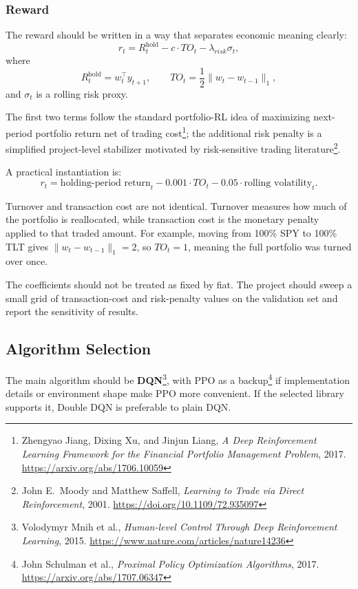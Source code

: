 \documentclass[11pt,a4paper]{article}
\newcommand{\fncite}[2]{\footnote{#1. \url{#2}}}
\begin{document}
\subsubsection{Reward}

The reward should be written in a way that separates economic meaning clearly:
\[
r_t = R^{\text{hold}}_t - c \cdot TO_t - \lambda_{risk}\sigma_t,
\]
where
\[
R^{\text{hold}}_t = w_t^\top y_{t+1},
\qquad
TO_t = \frac{1}{2}\lVert w_t - w_{t-1} \rVert_1,
\]
and $\sigma_t$ is a rolling risk proxy.

The first two terms follow the standard portfolio-RL idea of maximizing next-period portfolio return net of trading cost\fncite{Zhengyao Jiang, Dixing Xu, and Jinjun Liang, \emph{A Deep Reinforcement Learning Framework for the Financial Portfolio Management Problem}, 2017}{https://arxiv.org/abs/1706.10059}; the additional risk penalty is a simplified project-level stabilizer motivated by risk-sensitive trading literature\fncite{John E.~Moody and Matthew Saffell, \emph{Learning to Trade via Direct Reinforcement}, 2001}{https://doi.org/10.1109/72.935097}.

A practical instantiation is:
\[
r_t = \text{holding-period return}_t - 0.001 \cdot TO_t - 0.05 \cdot \text{rolling volatility}_t.
\]

Turnover and transaction cost are not identical.
Turnover measures how much of the portfolio is reallocated, while transaction cost is the monetary penalty applied to that traded amount.
For example, moving from 100\% SPY to 100\% TLT gives $\lVert w_t - w_{t-1} \rVert_1 = 2$, so $TO_t = 1$, meaning the full portfolio was turned over once.

The coefficients should not be treated as fixed by fiat.
The project should sweep a small grid of transaction-cost and risk-penalty values on the validation set and report the sensitivity of results.

\subsection{Algorithm Selection}

The main algorithm should be \textbf{DQN}\fncite{Volodymyr Mnih et al., \emph{Human-level Control Through Deep Reinforcement Learning}, 2015}{https://www.nature.com/articles/nature14236}, with PPO as a backup\fncite{John Schulman et al., \emph{Proximal Policy Optimization Algorithms}, 2017}{https://arxiv.org/abs/1707.06347} if implementation details or environment shape make PPO more convenient.
If the selected library supports it, Double DQN is preferable to plain DQN.
\end{document}
